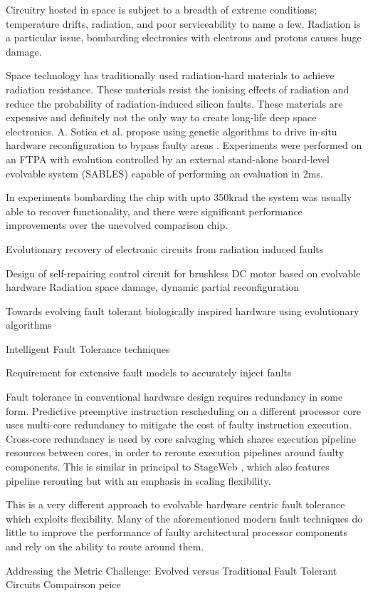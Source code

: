 Circuitry hosted in space is subject to a breadth of extreme conditions; temperature
drifts, radiation, and poor serviceability to name a few. Radiation is a particular
issue, bombarding electronics with electrons and protons causes huge damage.

Space technology has traditionally used radiation-hard materials to achieve
radiation resistance. These materials resist the ionising effects of radiation
and reduce the probability of radiation-induced silicon faults. These materials
are expensive and definitely not the only way to create long-life deep space
electronics. A. Sotica et al. propose using genetic algorithms to drive
in-situ hardware reconfiguration to bypass faulty areas \cite{1331112}. Experiments
were performed on an FTPA with evolution controlled by an external stand-alone
board-level evolvable system (SABLES) capable of performing an evaluation in 2ms.

In experiments bombarding the chip with upto 350krad the system was usually able
to recover functionality, and there were significant performance improvements over
the unevolved comparison chip.

\todo Evolutionary recovery of electronic circuits from radiation induced faults

\todo Design of self-repairing control circuit for brushless DC motor based on evolvable hardware\cite{8046381}
Radiation space damage, dynamic partial reconfiguration

\todo Towards evolving fault tolerant biologically inspired hardware using evolutionary algorithms

\todo Intelligent Fault Tolerance techniques

\todo Requirement for extensive fault models to accurately inject faults

Fault tolerance in conventional hardware design requires redundancy in some
form. Predictive preemptive instruction rescheduling on a different processor
core \cite{Soman} uses multi-core redundancy to mitigate the cost of faulty instruction
execution. Cross-core redundancy is used by core salvaging \cite{Powell} which shares execution
pipeline resources between cores, in order to reroute execution pipelines
around faulty components. This is similar in principal to StageWeb \cite{StageWeb}, which also
features pipeline rerouting but with an emphasis in scaling flexibility.

This is a very different approach to evolvable hardware centric fault
tolerance which exploits flexibility. Many of the aforementioned modern
fault techniques do little to improve the performance of faulty architectural
processor components and rely on the ability to route around them.

\todo Addressing the Metric Challenge: Evolved versus Traditional Fault Tolerant Circuits\cite{4291951}
Compairson peice
